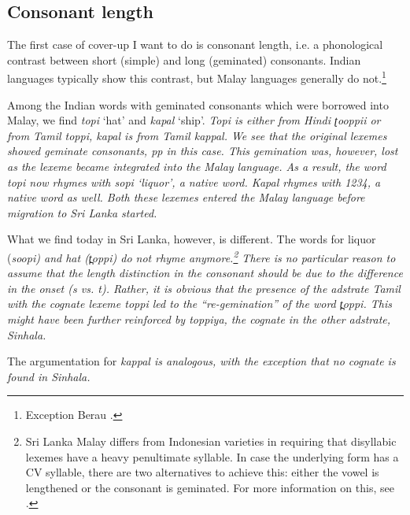 \documentclass[a4paper,10pt]{article}
\newcommand{\trs}[2]{\textit{#1} `#2'}
\newcommand{\tz}{ʈ}
\newcommand{\dentt}{t̪}
\begin{document}
\subsection{Consonant length} 
The first case of cover-up I want to do is consonant length, i.e. a phonological contrast between short (simple) and long (geminated) consonants. Indian languages typically show this contrast, but Malay languages generally do not.\footnote{Exception
 Berau \citep{abc}.
}

Among the Indian words with geminated consonants which were borrowed into Malay, we find \trs{topi}{hat}  and \trs{kapal}{ship}. \em Topi \em is either from Hindi \em {\tz}ooppii \em or from Tamil \em toppi\em, \em kapal \em is from Tamil \em kappal\em. We see that the original lexemes showed geminate consonants, \em pp \em in this case. This gemination was, however, lost as the lexeme became integrated into the Malay language. As a result, the word \em topi \em now rhymes with \trs{sopi}{liquor}, a native word. \em Kapal \em rhymes with \em 1234\em, a native word as well. Both these lexemes entered the Malay language before migration to Sri Lanka started.

What we find today in Sri Lanka, however, is different. The words for liquor (\em soopi\em) and hat (\em {\dentt}oppi\em) do not rhyme anymore.\footnote{Sri
 Lanka Malay differs from Indonesian varieties in requiring that disyllabic lexemes have  a heavy penultimate syllable. In case the underlying form has a  CV syllable, there are two alternatives to achieve this: either the vowel is lengthened or the consonant is geminated. For more information on this, see \citet{Nordhoff2009phd}.
} 
There is no particular reason to assume that the length distinction in the consonant should be due to the difference in the onset (\em s \em vs. \em t\em). Rather, it is obvious that the presence of the adstrate Tamil with the cognate lexeme \em toppi \em led to the ``re-gemination'' of the word \em {\dentt}oppi\em. This might have been further reinforced by \em toppiya\em, the cognate in the other adstrate, Sinhala. 

The argumentation for \em kappal \em is analogous, with the exception that no cognate is found in Sinhala. 


\end{document}
